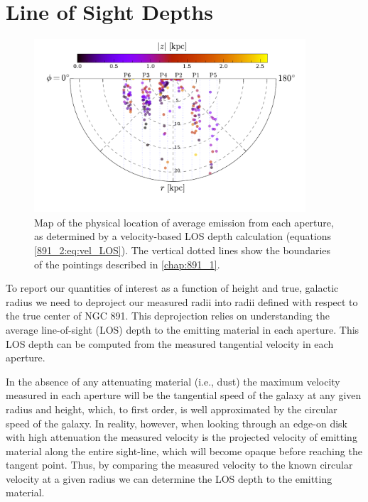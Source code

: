 \section{Line of Sight Depths}
\label{891_2:sec:LOS}

\begin{figure}
  \centering
  \includegraphics[width=0.9\textwidth, trim={0 1.5cm 0 0}, clip]{891_2/figs/velocity_projection.pdf}
  \caption[Map of \GP apertures in cylindrical
    coordinates]{\fixspacing\label{891_2:fig:velocity_projection}Map
    of the physical location of average emission from each aperture,
    as determined by a velocity-based LOS depth calculation (equations
    \ref{891_2:eq:vel_LOS}). The vertical dotted lines show the
    boundaries of the \GP pointings described in \ref{chap:891_1}.}
\end{figure}

To report our quantities of interest as a function of height and true,
galactic radius we need to deproject our measured radii into radii
defined with respect to the true center of NGC 891. This deprojection
relies on understanding the average line-of-sight (LOS) depth to the
emitting material in each \GP aperture. This LOS depth can be computed
from the measured tangential velocity in each aperture.

In the absence of any attenuating material (i.e., dust) the maximum
velocity measured in each aperture will be the tangential speed of the
galaxy at any given radius and height, which, to first order, is well
approximated by the circular speed of the galaxy.  In reality,
however, when looking through an edge-on disk with high attenuation
the measured velocity is the projected velocity of emitting material
along the entire sight-line, which will become opaque before reaching
the tangent point. Thus, by comparing the measured velocity to the
known circular velocity at a given radius we can determine the LOS
depth to the emitting material.

